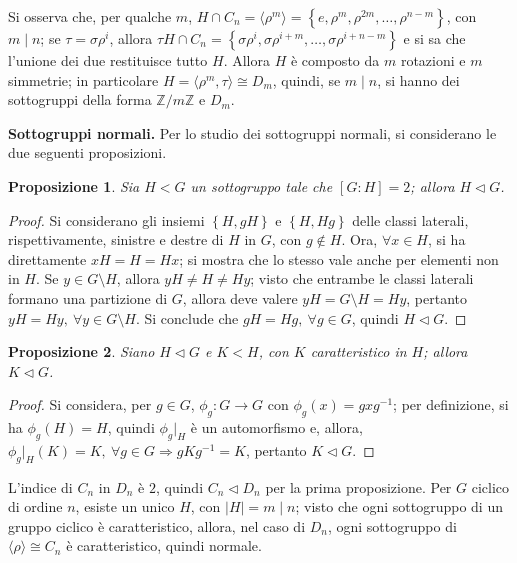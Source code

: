 \documentclass[12pt]{scrartcl}
\theoremstyle{style}
\newtheorem{prop}{Proposizione}[section]
\numberwithin{equation}{subsection}
\begin{document}
\noindent Si osserva che, per qualche $m$, $H \cap C_n = \langle \rho ^m \rangle= \left\{ e ,\rho ^m , \rho ^{2m} ,\ldots,\rho ^{n - m}  \right\} $, con $m  \mid  n$; se $\tau  = \sigma  \rho ^i $, allora $\tau  H \cap C_n = \left\{ \sigma \rho ^i, \sigma \rho ^{i+m}, \ldots, \sigma \rho ^{i+n - m}   \right\}$ e si sa che l'unione dei due restituisce tutto $H$.
Allora $H$ \`e composto da $m$ rotazioni e $m$ simmetrie; in particolare $H = \langle \rho ^m , \tau  \rangle\cong D_m$, quindi, se $m  \mid  n$, si hanno dei sottogruppi della forma $\mathbb{Z} / m \mathbb{Z}$ e $D_m$.
\vspace{5pt}

\textbf{Sottogruppi normali.} Per lo studio dei sottogruppi normali, si considerano le due seguenti proposizioni.
\begin{prop}
	Sia $H<G$ un sottogruppo tale che $[G:H] = 2$; allora $H\lhd G$.
\end{prop}
	\begin{proof}
		Si considerano gli insiemi $\left\{ H,gH \right\} $ e $\left\{ H,Hg \right\} $ delle classi laterali, rispettivamente, sinistre e destre di $H$ in $G$, con $g\not\in H$.
		Ora, $\forall x \in H$, si ha direttamente $xH=H=Hx$; si mostra che lo stesso vale anche per elementi non in $H$.
		Se $y \in G \setminus H$, allora $yH\neq H \neq Hy$; visto che entrambe le classi laterali formano una partizione di $G$, allora deve valere $yH = G \setminus H = Hy$, pertanto $yH=Hy, \ \forall y \in G \setminus H$.
		Si conclude che $gH=Hg, \ \forall g \in G$, quindi $H\lhd G$.
	\end{proof}
\begin{prop}
	Siano $H \lhd G$ e $K < H$, con $K$ caratteristico in $H$; allora $K \lhd G$.
\end{prop} 
	\begin{proof}
		Si considera, per $g \in G$, $\phi _g : G\to G$ con $\phi_g(x) = gxg^{-1}$; per definizione, si ha $\phi _g (H) = H$, quindi $\phi_g|_{H} $ \`e un automorfismo e, allora, $\phi _g|_{H} (K) = K, \ \forall g \in G \Rightarrow gKg^{-1} = K$, pertanto $K \lhd G$.
	\end{proof}

\noindent L'indice di $C_n$ in $D_n$ \`e $2$, quindi $C_n \lhd D_n$ per la prima proposizione.
Per $G$ ciclico di ordine $n$, esiste un unico $H $, con $\lvert H \rvert =m  \mid n$; visto che ogni sottogruppo di un gruppo ciclico \`e caratteristico, allora, nel caso di $D_n$, ogni sottogruppo di $\langle \rho  \rangle\cong C_n$ \`e caratteristico, quindi normale.
\end{document}
